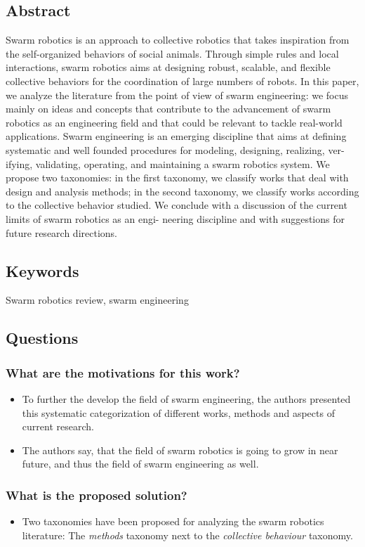 \documentclass{article}
\begin{document}
\subsection*{Abstract}
Swarm robotics is an approach to collective robotics that takes inspiration from
the self-organized behaviors of social animals. Through simple rules and local interactions,
swarm robotics aims at designing robust, scalable, and flexible collective behaviors for the
coordination of large numbers of robots. In this paper, we analyze the literature from the
point of view of swarm engineering: we focus mainly on ideas and concepts that contribute
to the advancement of swarm robotics as an engineering field and that could be relevant
to tackle real-world applications. Swarm engineering is an emerging discipline that aims at
defining systematic and well founded procedures for modeling, designing, realizing, ver-
ifying, validating, operating, and maintaining a swarm robotics system. We propose two
taxonomies: in the first taxonomy, we classify works that deal with design and analysis
methods; in the second taxonomy, we classify works according to the collective behavior
studied. We conclude with a discussion of the current limits of swarm robotics as an engi-
neering discipline and with suggestions for future research directions.

\subsection*{Keywords}
Swarm robotics review, swarm engineering


\subsection*{Questions}
\subsubsection*{What are the motivations for this work?}
\begin{itemize}
    \item To further the develop the field of swarm engineering, the authors presented this systematic categorization of different works, methods and aspects of current research.
    \item The authors say, that the field of swarm robotics is going to grow in near future, and thus the field of swarm engineering as well.
\end{itemize}
\subsubsection*{What is the proposed solution?}
\begin{itemize}
    \item Two taxonomies have been proposed for analyzing the swarm robotics literature: The \emph{methods} taxonomy next to the \emph{collective behaviour} taxonomy.
\end{itemize}
\end{document}

